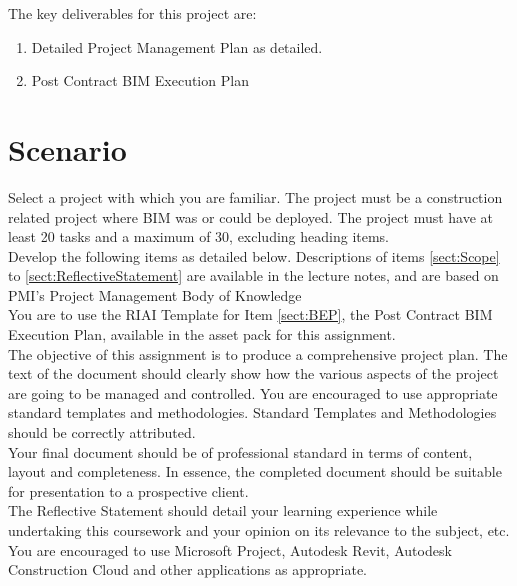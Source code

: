 The key deliverables for this project are:

\begin{enumerate}
	\item Detailed Project Management Plan as detailed.
	\item Post Contract BIM Execution Plan
\end{enumerate}


\section{Scenario}

Select a project with which you are familiar. The project must be a construction related project where BIM was or could be deployed.  The project must have at least 20 tasks and a maximum of 30, excluding heading items.\\

Develop the following items as detailed below. Descriptions of items \ref{sect:Scope} to \ref{sect:ReflectiveStatement} are available in the lecture notes, and are based on PMI's Project Management Body of Knowledge\\

You are to use the RIAI Template for Item \ref{sect:BEP}, the Post Contract BIM Execution Plan, available in the asset pack for this assignment.\\

The objective of this assignment is to produce a comprehensive project plan. The text of the document should clearly show how the various aspects of the project are going to be managed and controlled. You are encouraged to use appropriate standard templates and methodologies.  Standard Templates and Methodologies should be correctly attributed.\\

Your final document should be of professional standard in terms of content, layout and completeness. In essence, the completed document should be suitable for presentation to a prospective client.\\

The Reflective Statement should detail your learning experience while undertaking this coursework and your opinion on its relevance to the subject, etc.\\

You are encouraged to use Microsoft Project, Autodesk Revit, Autodesk Construction Cloud and other applications as appropriate.\\

